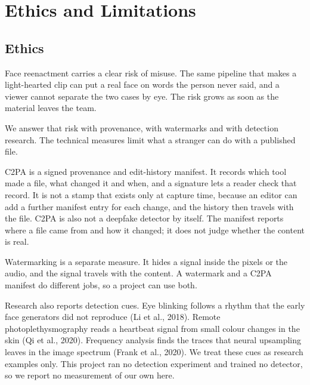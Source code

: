 
\section{Ethics and Limitations}

\subsection{Ethics}
Face reenactment carries a clear risk of misuse. The same pipeline that makes a
light-hearted clip can put a real face on words the person never said, and a
viewer cannot separate the two cases by eye. The risk grows as soon as the
material leaves the team.

We answer that risk with provenance, with watermarks and with detection
research. The technical measures limit what a stranger can do with a published
file.

C2PA is a signed provenance and edit-history manifest. It records which tool
made a file, what changed it and when, and a signature lets a reader check that
record. It is not a stamp that exists only at capture time, because an editor
can add a further manifest entry for each change, and the history then travels
with the file. C2PA is also not a deepfake detector by itself. The manifest
reports where a file came from and how it changed; it does not judge whether the
content is real.

Watermarking is a separate measure. It hides a signal inside the pixels or the
audio, and the signal travels with the content. A watermark and a C2PA manifest
do different jobs, so a project can use both.

Research also reports detection cues. Eye blinking follows a rhythm that the
early face generators did not reproduce (Li et al., 2018). Remote
photoplethysmography reads a heartbeat signal from small colour changes in the
skin (Qi et al., 2020). Frequency analysis finds the traces that neural
upsampling leaves in the image spectrum (Frank et al., 2020). We treat these
cues as research examples only. This project ran no detection experiment and
trained no detector, so we report no measurement of our own here.

